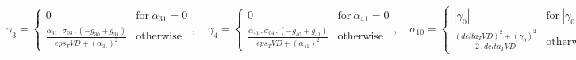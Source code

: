 \documentclass{article}
\begin{document}
\begin{dmath}
\quad \gamma_{3} = \begin{cases} 0 & \text{for}\: \alpha_{31} = 0 \\\frac{\alpha_{31} \,.\, \sigma_{0 3} \,.\, \left(- g_{30} + g_{31}\right)}{eps_TVD + \left(\alpha_{31} \right)^{2}} & \text{otherwise} \end{cases}, \quad \gamma_{4} = \begin{cases} 0 
& \text{for}\: \alpha_{41} = 0 \\\frac{\alpha_{41} \,.\, \sigma_{0 4} \,.\, \left(- g_{40} + g_{41}\right)}{eps_TVD + \left(\alpha_{41} \right)^{2}} & \text{otherwise} \end{cases}, \quad \sigma_{1 0} = \begin{cases} \left|{\gamma_{0}}\right| & 
\text{for}\: \left|{\gamma_{0}}\right| \geq delta_TVD \\\frac{\left(delta_TVD \right)^{2} + \left(\gamma_{0} \right)^{2}}{2 \,.\, delta_TVD} & \text{otherwise} \end{cases}, \quad \sigma_{1 1} = \begin{cases} \left|{\gamma_{1}}\right| & \text{for}\: 
\left|{\gamma_{1}}\right| \geq delta_TVD \\\frac{\left(delta_TVD \right)^{2} + \left(\gamma_{1} \right)^{2}}{2 \,.\, delta_TVD} & \text{otherwise} \end{cases}, \quad \sigma_{1 2} = \begin{cases} \left|{\gamma_{2}}\right| & \text{for}\: 
\left|{\gamma_{2}}\right| \geq delta_TVD \\\frac{\left(delta_TVD \right)^{2} + \left(\gamma_{2} \right)^{2}}{2 \,.\, delta_TVD} & \text{otherwise} \end{cases}, \quad \sigma_{1 3} = \begin{cases} \left|{\gamma_{3}}\right| & \text{for}\: 
\left|{\gamma_{3}}\right| \geq delta_TVD \\\frac{\left(delta_TVD \right)^{2} + \left(\gamma_{3} \right)^{2}}{2 \,.\, delta_TVD} & \text{otherwise} \end{cases}, \quad \sigma_{1 4} = \begin{cases} \left|{\gamma_{4}}\right| & \text{for}\: 
\left|{\gamma_{4}}\right| \geq delta_TVD \\\frac{\left(delta_TVD \right)^{2} + \left(\gamma_{4} \right)^{2}}{2 \,.\, delta_TVD} & \text{otherwise} \end{cases}, \quad \phi_{0} = - \alpha_{01} \,.\, \left|{\sigma_{0 0} + \sigma_{1 0}}\right| + 0.5 
\,.\, \sigma_{0 0} \,.\, \left(g_{00} + g_{01}\right), \quad \phi_{1} = - \alpha_{11} \,.\, \left|{\sigma_{0 1} + \sigma_{1 1}}\right| + 0.5 \,.\, \sigma_{0 1} \,.\, \left(g_{10} + g_{11}\right), \quad \phi_{2} = - \alpha_{21} \,.\, \left|{\sigma_{0 
}}
\end{dmath}
\end{document}
